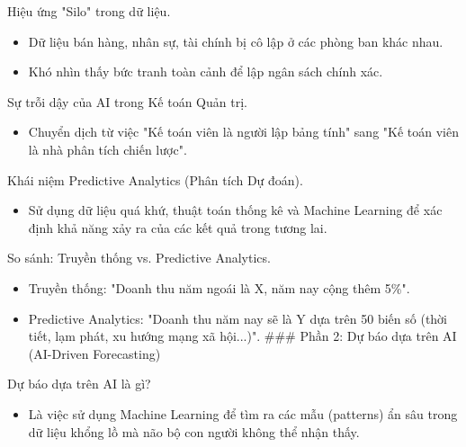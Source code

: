 \documentclass[aspectratio=169]{beamer}
\begin{document}
\begin{frame}{Hiệu ứng "Silo" trong dữ liệu.}
    \begin{itemize}
        \item Dữ liệu bán hàng, nhân sự, tài chính bị cô lập ở các phòng ban khác nhau.
        \item Khó nhìn thấy bức tranh toàn cảnh để lập ngân sách chính xác.
    \end{itemize}
\end{frame}


\begin{frame}{Sự trỗi dậy của AI trong Kế toán Quản trị.}
    \begin{itemize}
        \item Chuyển dịch từ việc "Kế toán viên là người lập bảng tính" sang "Kế toán viên là nhà phân tích chiến lược".
    \end{itemize}
\end{frame}


\begin{frame}{Khái niệm Predictive Analytics (Phân tích Dự đoán).}
    \begin{itemize}
        \item Sử dụng dữ liệu quá khứ, thuật toán thống kê và Machine Learning để xác định khả năng xảy ra của các kết quả trong tương lai.
    \end{itemize}
\end{frame}


\begin{frame}{So sánh: Truyền thống vs. Predictive Analytics.}
    \begin{itemize}
        \item Truyền thống: "Doanh thu năm ngoái là X, năm nay cộng thêm 5\%".
        \item Predictive Analytics: "Doanh thu năm nay sẽ là Y dựa trên 50 biến số (thời tiết, lạm phát, xu hướng mạng xã hội...)".
        ### Phần 2: Dự báo dựa trên AI (AI-Driven Forecasting)
    \end{itemize}
\end{frame}


\begin{frame}{Dự báo dựa trên AI là gì?}
    \begin{itemize}
        \item Là việc sử dụng Machine Learning để tìm ra các mẫu (patterns) ẩn sâu trong dữ liệu khổng lồ mà não bộ con người không thể nhận thấy.
    \end{itemize}
\end{frame}
\end{document}

